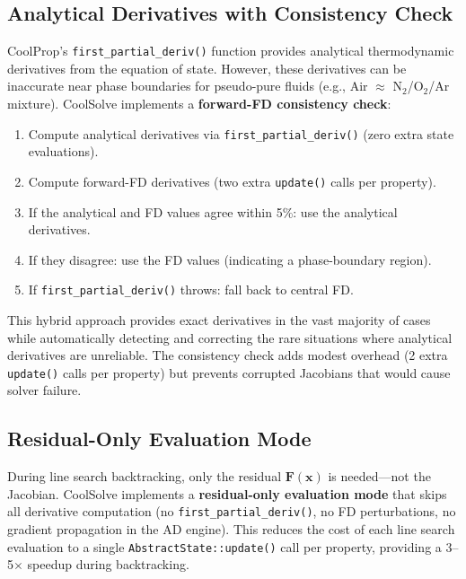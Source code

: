 \documentclass[review,3p]{elsarticle}
\begin{document}
\subsection{Analytical Derivatives with Consistency Check}

CoolProp's \texttt{first\_partial\_deriv()} function provides analytical thermodynamic derivatives from the equation of state. However, these derivatives can be inaccurate near phase boundaries for pseudo-pure fluids (e.g., Air $\approx$ N$_2$/O$_2$/Ar mixture). CoolSolve implements a \textbf{forward-FD consistency check}:
\begin{enumerate}
    \item Compute analytical derivatives via \texttt{first\_partial\_deriv()} (zero extra state evaluations).
    \item Compute forward-FD derivatives (two extra \texttt{update()} calls per property).
    \item If the analytical and FD values agree within 5\%: use the analytical derivatives.
    \item If they disagree: use the FD values (indicating a phase-boundary region).
    \item If \texttt{first\_partial\_deriv()} throws: fall back to central FD.
\end{enumerate}

This hybrid approach provides exact derivatives in the vast majority of cases while automatically detecting and correcting the rare situations where analytical derivatives are unreliable. The consistency check adds modest overhead (2 extra \texttt{update()} calls per property) but prevents corrupted Jacobians that would cause solver failure.

\subsection{Residual-Only Evaluation Mode}

During line search backtracking, only the residual $\mathbf{F}(\mathbf{x})$ is needed---not the Jacobian. CoolSolve implements a \textbf{residual-only evaluation mode} that skips all derivative computation (no \texttt{first\_partial\_deriv()}, no FD perturbations, no gradient propagation in the AD engine). This reduces the cost of each line search evaluation to a single \texttt{AbstractState::update()} call per property, providing a 3--5$\times$ speedup during backtracking.

\end{document}
